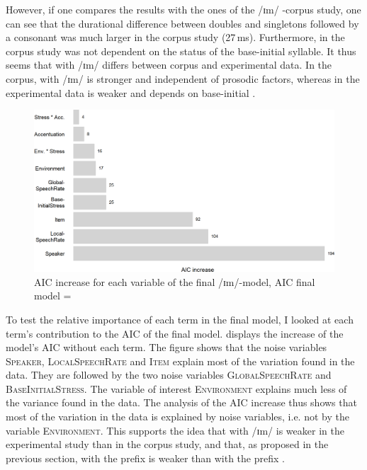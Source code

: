 However, if one compares the results with the ones of the /ɪm/ -corpus study, one can see that the durational difference between doubles and singletons followed by a consonant was much larger in the corpus study (27\,ms). Furthermore, in the corpus study  was not dependent on the  status of the base-initial syllable.
It thus seems that  with /ɪm/  differs between corpus and experimental data. In the corpus,  with /ɪm/  is stronger and independent of prosodic factors, whereas in the experimental data  is weaker and depends on base-initial .


\begin{figure}
	\includegraphics[scale=0.7]{images/Experiment/AICdecreaseImComplex.png}
	\caption{AIC increase for each variable of the final /ɪm/-model, AIC final model = }
	\label{fig:Effectsize im experiment}
\end{figure}

To test the relative importance of each term in the final model, I looked at each term's contribution to the AIC of the final model.  displays the increase of the model's AIC  without each term. 
The figure shows that the noise variables \textsc{Speaker}, \textsc{LocalSpeechRate} and \textsc{Item} explain  most of the variation found in the data. They are followed by the two noise variables \textsc{GlobalSpeechRate} and \textsc{BaseInitialStress}. The variable of interest \textsc{Environment} explains much less of the variance found in the data. The analysis of the AIC increase thus shows that most of the variation in the data is explained by noise variables, i.e. not by the variable \textsc{Environment}. This supports the idea that  with /ɪm/  is weaker in the experimental study than in the corpus study, and that, as proposed in the previous section,  with the prefix  is weaker than  with the prefix  . 




